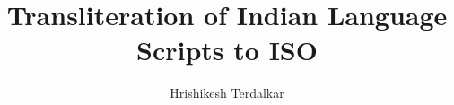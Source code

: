 \documentclass[10pt]{article}
\title{Transliteration of Indian Language Scripts to ISO}
\author{Hrishikesh Terdalkar}
\begin{document}
\maketitle







\pagebreak

\nocite{*}



\end{document}
